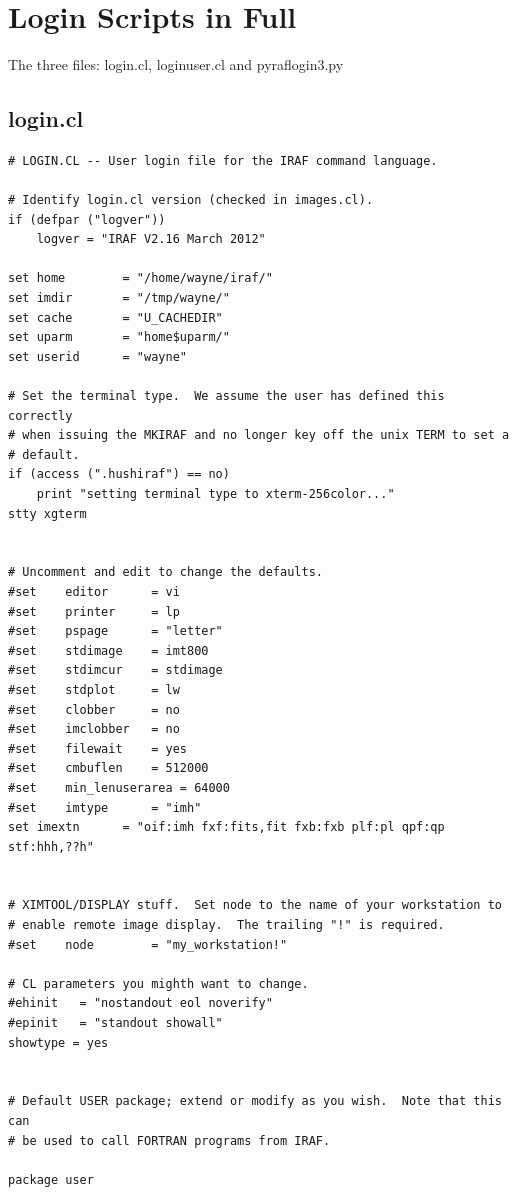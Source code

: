 
\renewcommand{\footerfilename}{LoginScripts.tex}

\section{Login Scripts in Full} \label{sec:LoginScriptsInFull}

The three files: login.cl, loginuser.cl and pyraflogin3.py

\subsection{login.cl}

{\color{darkred}
\begingroup \fontsize{10pt}{10pt}
\selectfont
\begin{verbatim} 
# LOGIN.CL -- User login file for the IRAF command language.

# Identify login.cl version (checked in images.cl).
if (defpar ("logver"))
    logver = "IRAF V2.16 March 2012"

set	home		= "/home/wayne/iraf/"
set	imdir		= "/tmp/wayne/"
set	cache		= "U_CACHEDIR"
set	uparm		= "home$uparm/"
set	userid		= "wayne"

# Set the terminal type.  We assume the user has defined this correctly 
# when issuing the MKIRAF and no longer key off the unix TERM to set a
# default.
if (access (".hushiraf") == no)
    print "setting terminal type to xterm-256color..."
stty xgterm


# Uncomment and edit to change the defaults.
#set	editor		= vi
#set	printer		= lp
#set	pspage		= "letter"
#set	stdimage	= imt800
#set	stdimcur	= stdimage
#set	stdplot		= lw
#set	clobber		= no
#set	imclobber	= no
#set	filewait	= yes
#set	cmbuflen	= 512000
#set	min_lenuserarea	= 64000
#set	imtype		= "imh"
set	imextn		= "oif:imh fxf:fits,fit fxb:fxb plf:pl qpf:qp stf:hhh,??h"


# XIMTOOL/DISPLAY stuff.  Set node to the name of your workstation to
# enable remote image display.  The trailing "!" is required.
#set	node		= "my_workstation!"

# CL parameters you mighth want to change.
#ehinit   = "nostandout eol noverify"
#epinit   = "standout showall"
showtype = yes


# Default USER package; extend or modify as you wish.  Note that this can
# be used to call FORTRAN programs from IRAF.

package user


\end{verbatim}}
